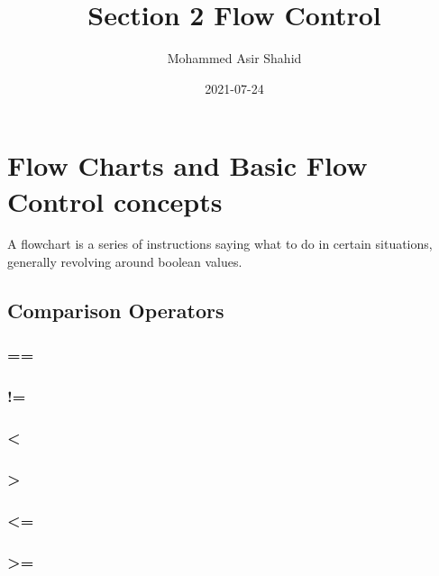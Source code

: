 \documentclass[11pt]{article}
\author{Mohammed Asir Shahid}
\date{2021-07-24}
\title{Section 2 Flow Control}
\begin{document}
\maketitle
\tableofcontents



\section{Flow Charts and Basic Flow Control concepts}
\label{sec:orgfa76c8b}

A flowchart is a series of instructions saying what to do in certain situations, generally revolving around boolean values.

\subsection{Comparison Operators}
\label{sec:org2736ebd}
\subsubsection{==}
\label{sec:org7061454}
\subsubsection{!=}
\label{sec:org09433cb}
\subsubsection{<}
\label{sec:orgb4d0b7f}
\subsubsection{>}
\label{sec:orgbb3f44b}
\subsubsection{<=}
\label{sec:org62f6643}
\subsubsection{>=}
\label{sec:orgea32a54}
\subsection{}
\label{sec:org327b71e}
\end{document}
